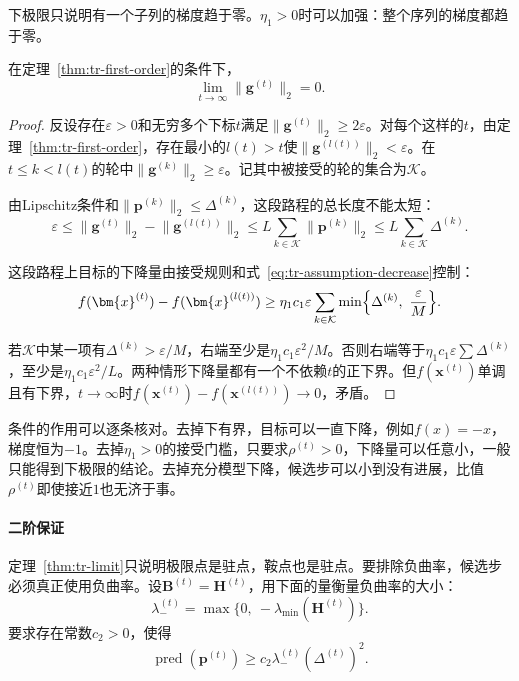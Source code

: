 下极限只说明有一个子列的梯度趋于零。$\eta_1>0$时可以加强：整个序列的梯度都趋于零。

\begin{theorem}[梯度趋于零]
 \label{thm:tr-limit}
 在定理~\ref{thm:tr-first-order}的条件下，
 \begin{equation}
  \lim_{t\to\infty}\lVert\bm{g}^{(t)}\rVert_2=0.
  \label{eq:tr-limit}
 \end{equation}
\end{theorem}

\begin{proof}
 反设存在$\varepsilon>0$和无穷多个下标$t$满足$\lVert\bm{g}^{(t)}\rVert_2\geq2\varepsilon$。对每个这样的$t$，由定理~\ref{thm:tr-first-order}，存在最小的$l(t)>t$使$\lVert\bm{g}^{(l(t))}\rVert_2<\varepsilon$。在$t\leq k<l(t)$的轮中$\lVert\bm{g}^{(k)}\rVert_2\geq\varepsilon$。记其中被接受的轮的集合为$\mathcal{K}$。

 由Lipschitz条件和$\lVert\bm{p}^{(k)}\rVert_2\leq\Delta^{(k)}$，这段路程的总长度不能太短：
 \[
  \varepsilon\leq\lVert\bm{g}^{(t)}\rVert_2-\lVert\bm{g}^{(l(t))}\rVert_2\leq L\sum_{k\in\mathcal{K}}\lVert\bm{p}^{(k)}\rVert_2\leq L\sum_{k\in\mathcal{K}}\Delta^{(k)}.
 \]

 这段路程上目标的下降量由接受规则和式~\eqref{eq:tr-assumption-decrease}控制：
 \[
  f(\bm{x}^{(t)})-f(\bm{x}^{(l(t))})\geq\eta_1c_1\varepsilon\sum_{k\in\mathcal{K}}\min\Bigl\{\Delta^{(k)},\ \frac{\varepsilon}{M}\Bigr\}.
 \]

 若$\mathcal{K}$中某一项有$\Delta^{(k)}>\varepsilon/M$，右端至少是$\eta_1c_1\varepsilon^2/M$。否则右端等于$\eta_1c_1\varepsilon\sum\Delta^{(k)}$，至少是$\eta_1c_1\varepsilon^2/L$。两种情形下降量都有一个不依赖$t$的正下界。但$f(\bm{x}^{(t)})$单调且有下界，$t\to\infty$时$f(\bm{x}^{(t)})-f(\bm{x}^{(l(t))})\to0$，矛盾。
\end{proof}

条件的作用可以逐条核对。去掉下有界，目标可以一直下降，例如$f(x)=-x$，梯度恒为$-1$。去掉$\eta_1>0$的接受门槛，只要求$\rho^{(t)}>0$，下降量可以任意小，一般只能得到下极限的结论。去掉充分模型下降，候选步可以小到没有进展，比值$\rho^{(t)}$即使接近$1$也无济于事。

\paragraph{二阶保证}
定理~\ref{thm:tr-limit}只说明极限点是驻点，鞍点也是驻点。要排除负曲率，候选步必须真正使用负曲率。设$\bm{B}^{(t)}=\bm{H}^{(t)}$，用下面的量衡量负曲率的大小：
\[
 \lambda^{(t)}_-=\max\{0,\ -\lambda_{\min}(\bm{H}^{(t)})\}.
\]
要求存在常数$c_2>0$，使得
\begin{equation}
 \operatorname{pred}(\bm{p}^{(t)})\geq c_2\lambda^{(t)}_-(\Delta^{(t)})^2.
 \label{eq:tr-eigen-decrease}
\end{equation}

